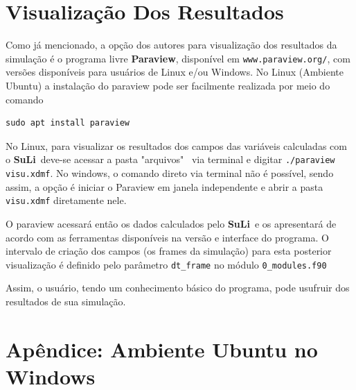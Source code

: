 \documentclass[12pt, a4paper]{article}
\newcommand{\SL}{{\bf SuLi}}
\begin{document}

\newpage
\section{Visualização Dos Resultados}	\label{visu}
Como já mencionado, a opção dos autores para visualização dos resultados da simulação é o programa livre \textbf{Paraview}, disponível em \verb|www.paraview.org/|, com versões disponíveis para usuários de Linux e/ou Windows. No Linux (Ambiente Ubuntu) a instalação do paraview pode ser facilmente realizada por meio do comando 

\begin{verbatim}
sudo apt install paraview
\end{verbatim}

No Linux, para visualizar os resultados dos campos das variáveis calculadas com o \SL\ deve-se acessar a pasta "arquivos" \, via terminal e digitar \verb|./paraview visu.xdmf|. No windows, o comando direto via terminal não é possível, sendo assim, a opção é iniciar o Paraview em janela independente e abrir a pasta \verb|visu.xdmf| diretamente nele.



O paraview acessará então os dados calculados pelo \SL\ e os apresentará de acordo com as ferramentas disponíveis na versão e interface do programa. O intervalo de criação dos campos (os frames da simulação) para esta posterior visualização é definido pelo parâmetro \verb|dt_frame| no módulo \verb|0_modules.f90|

Assim, o usuário, tendo um conhecimento básico do programa, pode usufruir dos resultados de sua simulação.




\newpage
\appendix
\section{Apêndice: Ambiente Ubuntu no Windows}
\label{InstallUbuntu}
\end{document}
